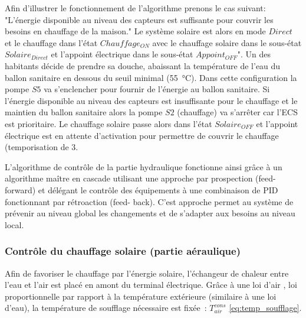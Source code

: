 Afin d’illustrer le fonctionnement de l’algorithme prenons le cas suivant: "L’énergie
disponible au niveau des capteurs est suffisante pour couvrir les besoins en chauffage de
la maison." Le système solaire est alors en mode $Direct$ et le chauffage dans l’état
$Chauffage_{ON}$ avec le chauffage solaire dans le sous-état $Solaire_{Direct}$ et
l’appoint électrique dans le sous-état $Appoint_{OFF}$". Un des habitants décide de
prendre sa douche, abaissant la température de l’eau du ballon sanitaire en dessous du
seuil minimal (\SI{55}{\celsius}). Dans cette configuration la pompe $S5$ va s’enclencher
pour fournir de l’énergie au ballon sanitaire. Si l’énergie disponible au niveau des
capteurs est insuffisante pour le chauffage et le maintien du ballon sanitaire alors la
pompe $S2$ (chauffage) va s’arrêter car l’ECS est prioritaire. Le chauffage solaire passe
alors dans l’état $Solaire_{OFF}$ et l’appoint électrique est en attente d’activation pour
permettre de couvrir le chauffage (temporisation de \SI{3}{\min}.


L’algorithme de contrôle de la partie hydraulique fonctionne ainsi grâce à un algorithme
maître en cascade utilisant une approche par prospection (feed-forward) et délégant le
contrôle des équipements à une combinaison de PID fonctionnant par rétroaction (feed-
back). C’est approche permet au système de prévenir au niveau global les changements et de
s’adapter aux besoins au niveau local.


\subsubsection{Contrôle du chauffage solaire (partie aéraulique)} %
\label{ssub:controle_du_chauffage_solaire}
Afin de favoriser le chauffage par l’énergie solaire, l’échangeur de chaleur entre l’eau
et l’air est placé en amont du terminal électrique. Grâce à une loi d’air , loi
proportionnelle par rapport à la température extérieure (similaire à une loi d’eau), la
température de soufflage nécessaire est fixée~: $T_{air}^{cons}$ \autoref{eq:temp_soufflage}.

